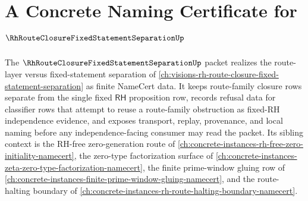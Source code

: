 \chapter{A Concrete Naming Certificate for $\RhRouteClosureFixedStatementSeparationUp$}
\label{ch:concrete-instances-rh-route-closure-fixed-statement-separation-namecert}

The $\RhRouteClosureFixedStatementSeparationUp$ packet realizes the route-layer versus fixed-statement separation of \autoref{ch:visions-rh-route-closure-fixed-statement-separation} as finite NameCert data. It keeps route-family closure rows separate from the single fixed $\mathsf{RH}$ proposition row, records refusal data for classifier rows that attempt to reuse a route-family obstruction as fixed-RH independence evidence, and exposes transport, replay, provenance, and local naming before any independence-facing consumer may read the packet. Its sibling context is the RH-free zero-generation route of \autoref{ch:concrete-instances-rh-free-zero-initiality-namecert}, the zero-type factorization surface of \autoref{ch:concrete-instances-zeta-zero-type-factorization-namecert}, the finite prime-window gluing row of \autoref{ch:concrete-instances-finite-prime-window-gluing-namecert}, and the route-halting boundary of \autoref{ch:concrete-instances-rh-route-halting-boundary-namecert}.

